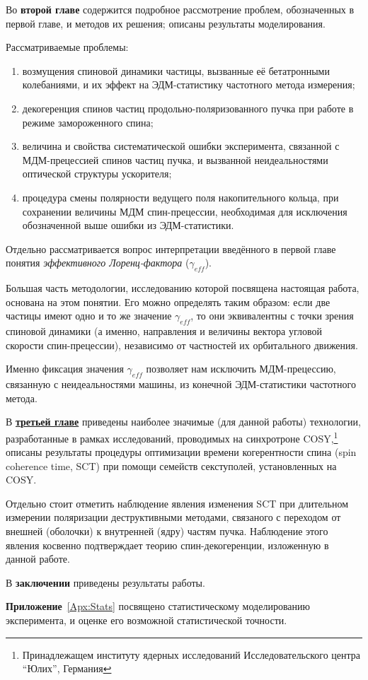 Во \textbf{второй главе} содержится подробное рассмотрение проблем, обозначенных в первой главе, и методов их решения; описаны результаты моделирования. 

Рассматриваемые проблемы:
\begin{enumerate}
	\item возмущения спиновой динамики частицы, вызванные её бетатронными колебаниями, и их эффект на ЭДМ-статистику частотного метода измерения;
	\item декогеренция спинов частиц продольно-поляризованного пучка при работе в режиме замороженного спина;
	\item величина и свойства систематической ошибки эксперимента, связанной с МДМ-прецессией спинов частиц пучка, и вызванной неидеальностями оптической структуры ускорителя;
	\item процедура смены полярности ведущего поля накопительного кольца, при сохранении величины МДМ спин-прецессии, необходимая для исключения обозначенной выше ошибки из ЭДМ-статистики.
\end{enumerate}

Отдельно рассматривается вопрос интерпретации введённого в первой главе понятия \emph{эффективного Лоренц-фактора} ($\gamma_{eff}$). 

Большая часть методологии, исследованию которой посвящена настоящая работа, основана на этом понятии. Его можно определять таким образом: если две частицы имеют одно и то же значение $\gamma_{eff}$, то они эквивалентны с точки зрения спиновой динамики (а именно, направления и величины вектора угловой скорости спин-прецессии), независимо от частностей их орбитального движения. 

Именно фиксация значения $\gamma_{eff}$ позволяет нам исключить МДМ-прецессию, связанную с неидеальностями машины, из конечной ЭДМ-статистики частотного метода.

В \underline{\textbf{третьей главе}} приведены наиболее значимые (для данной работы) технологии, разработанные в рамках исследований, проводимых на синхротроне COSY,\footnote{Принадлежащем институту ядерных исследований Исследовательского центра ``Юлих'', Германия} описаны результаты процедуры оптимизации времени когерентности спина (spin coherence time, SCT) при помощи семейств секступолей, установленных на COSY. 

Отдельно стоит отметить наблюдение явления изменения SCT при длительном измерении поляризации деструктивными методами, связаного с переходом от внешней (оболочки) к внутренней (ядру) частям пучка. Наблюдение этого явления косвенно подтверждает теорию спин-декогеренции, изложенную в данной работе.

В \textbf{заключении} приведены результаты работы.

\textbf{Приложение}~\ref{Apx:Stats} посвящено статистическому моделированию эксперимента, и оценке его возможной статистической точности.